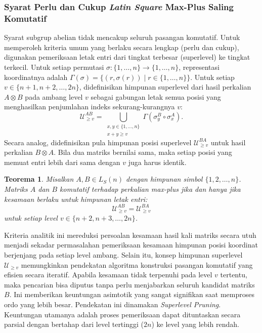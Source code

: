 \documentclass[journal]{IEEEtran}
\newtheorem{teo}[defn]{Teorema}
\theoremstyle{definition}
\theoremstyle{plain}
\begin{document}
\subsubsection{Syarat Perlu dan Cukup \textit{Latin Square} Max-Plus Saling Komutatif}
Syarat subgrup abelian tidak mencakup seluruh pasangan komutatif. Untuk memperoleh kriteria umum yang berlaku secara lengkap (perlu dan cukup), digunakan pemeriksaan letak entri dari tingkat terbesar (superlevel) ke tingkat terkecil.
Untuk setiap permutasi $\sigma : \{1, \ldots, n\} \to \{1, \ldots, n\}$, representasi koordinatnya adalah $\Gamma(\sigma) = \{(r, \sigma(r)) \mid r \in \{1, \ldots, n\}\}$. Untuk setiap $v\in\{n+1,n+2,\ldots,2n\}$, didefinisikan himpunan superlevel dari hasil perkalian $A \otimes B$ pada ambang level $v$ sebagai gabungan letak semua posisi yang menghasilkan penjumlahan indeks sekurang-kurangnya $v$:
\begin{equation}
    \mathcal{U}_{\geq v}^{AB}=
    \bigcup_{\substack{x,y\in\{1,\ldots,n\}\\x+y\geq v}}
    \Gamma(\sigma_y^B\circ\sigma_x^A).
\end{equation}
Secara analog, didefinisikan pula himpunan posisi superlevel $\mathcal{U}_{\geq v}^{BA}$ untuk hasil perkalian $B \otimes A$.
Bila dua matriks bernilai sama, maka setiap posisi yang memuat entri lebih dari sama dengan $v$ juga harus identik.
\begin{teo}
    Misalkan $A,B\in L_S(n)$ dengan himpunan simbol $\{1,2,\ldots,n\}$.
    Matriks $A$ dan $B$ komutatif terhadap perkalian max-plus jika dan hanya jika kesamaan berlaku untuk himpunan letak entri:
    \begin{equation}
        \mathcal{U}_{\geq v}^{AB}=\mathcal{U}_{\geq v}^{BA}
    \end{equation}
    untuk setiap level $v\in\{n+2,n+3,\ldots,2n\}$.
\end{teo}
Kriteria analitik ini mereduksi persoalan kesamaan hasil kali matriks secara utuh menjadi sekadar permasalahan pemeriksaan kesamaan himpunan posisi koordinat berjenjang pada setiap level ambang.
Selain itu, konsep himpunan superlevel $\mathcal{U}_{\geq v}$ memungkinkan pendekatan algoritma konstruksi pasangan komutatif yang efisien secara iteratif. Apabila kesamaan tidak terpenuhi pada level $v$ tertentu, maka pencarian bisa diputus tanpa perlu menjabarkan seluruh kandidat matriks $B$. Ini memberikan keuntungan asimtotik yang sangat signifikan saat memproses ordo yang lebih besar. Pendekatan ini dinamakan \textit{Superlevel Pruning}.
Keuntungan utamanya adalah proses pemeriksaan dapat dituntaskan secara parsial dengan bertahap dari level tertinggi ($2n$) ke level yang lebih rendah.
\end{document}
